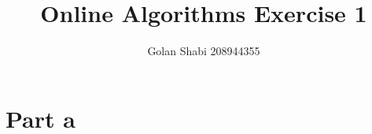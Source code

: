 \documentclass{article}
\title{Online Algorithms Exercise 1}
\author{Golan Shabi 208944355}
\begin{document}
\maketitle
\section{Part a}
\end{document}
